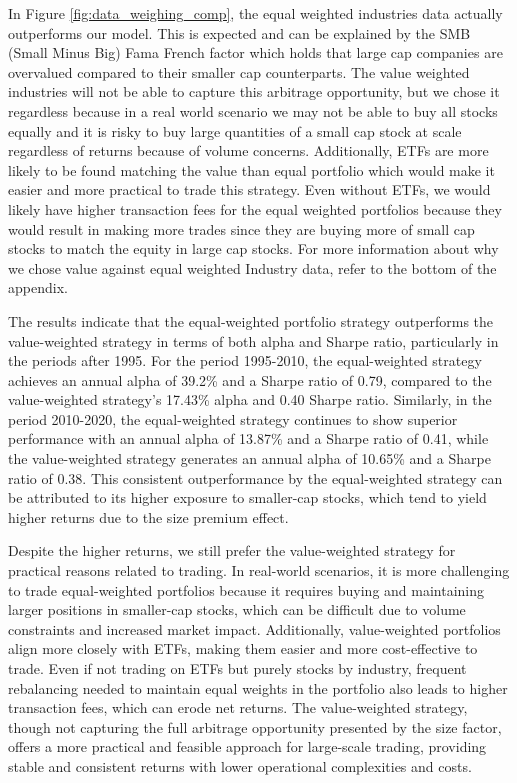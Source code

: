 \documentclass{article}
\begin{document}
In Figure \ref{fig:data_weighing_comp}, the equal weighted industries data actually outperforms our model. This is expected and can be explained by the SMB (Small Minus Big) Fama French factor which holds that large cap companies are overvalued compared to their smaller cap counterparts. The value weighted industries will not be able to capture this arbitrage opportunity, but we chose it regardless because in a real world scenario we may not be able to buy all stocks equally and it is risky to buy large quantities of a small cap stock at scale regardless of returns because of volume concerns. Additionally, ETFs are more likely to be found matching the value than equal portfolio which would make it easier  and more practical to trade this strategy. Even without ETFs, we would likely have higher transaction fees for the equal weighted portfolios because they would result in making more trades since they are buying more of small cap stocks to match the equity in large cap stocks. For more information about why we chose value against equal weighted Industry data, refer to the bottom of the appendix.

The results indicate that the equal-weighted portfolio strategy outperforms the value-weighted strategy in terms of both alpha and Sharpe ratio, particularly in the periods after 1995. For the period 1995-2010, the equal-weighted strategy achieves an annual alpha of 39.2\% and a Sharpe ratio of 0.79, compared to the value-weighted strategy's 17.43\% alpha and 0.40 Sharpe ratio. Similarly, in the period 2010-2020, the equal-weighted strategy continues to show superior performance with an annual alpha of 13.87\% and a Sharpe ratio of 0.41, while the value-weighted strategy generates an annual alpha of 10.65\% and a Sharpe ratio of 0.38. This consistent outperformance by the equal-weighted strategy can be attributed to its higher exposure to smaller-cap stocks, which tend to yield higher returns due to the size premium effect.

Despite the higher returns, we still prefer the value-weighted strategy for practical reasons related to trading. In real-world scenarios, it is more challenging to trade equal-weighted portfolios because it requires buying and maintaining larger positions in smaller-cap stocks, which can be difficult due to volume constraints and increased market impact. Additionally, value-weighted portfolios align more closely with ETFs, making them easier and more cost-effective to trade. Even if not trading on ETFs but purely stocks by industry, frequent rebalancing needed to maintain equal weights in the portfolio also leads to higher transaction fees, which can erode net returns. The value-weighted strategy, though not capturing the full arbitrage opportunity presented by the size factor, offers a more practical and feasible approach for large-scale trading, providing stable and consistent returns with lower operational complexities and costs.
\end{document}
